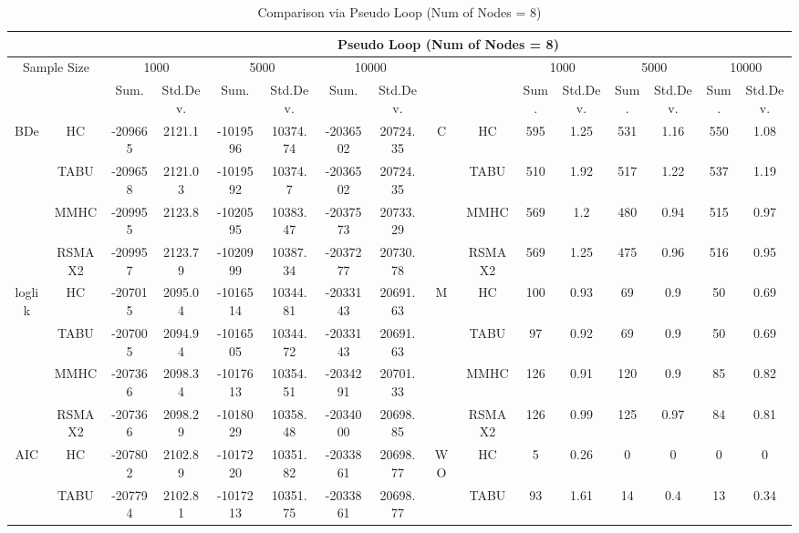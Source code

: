 \begin{table}[p]																										
\centering	\caption{Comparison via Pseudo Loop (Num of Nodes = 8)}	\tiny																						
{\tabcolsep=0.01in																										
\begin{tabular}{cc||cc|cc|cc||cc|cc|cc|cc}																										
\hline																										
&	&	\multicolumn{14}{c}{Pseudo Loop	(Num	of	Nodes	=	8)}\tabularnewline																			
\hline																										
\multicolumn{2}{c||}{Sample	Size}	&	\multicolumn{2}{c|}{1000}	&	\multicolumn{2}{c|}{5000}	&	\multicolumn{2}{c||}{10000}	&	&	&	\multicolumn{2}{c|}{1000}	&	\multicolumn{2}{c|}{5000}	&	\multicolumn{2}{c}{10000}\tabularnewline											
\hline																										
&	&	Sum.	&	Std.Dev.	&	Sum.	&	Std.Dev.	&	Sum.	&	Std.Dev.	&	&	&	Sum.	&	Std.Dev.	&	Sum.	&	Std.Dev.	&	Sum.	&	Std.Dev.\tabularnewline
\hline																										
\hline																										
\multirow{4}{*}{BDe} & HC &	-209665 & 	2121.1 & 	-1019596 & 	10374.74 & 	-2036502 & 	20724.35 & 	\multirow{4}{*}{C} & HC &	595 & 	1.25 & 	531 & 	1.16 & 	550 & 	1.08\tabularnewline													
& TABU &	-209658 & 	2121.03 & 	-1019592 & 	10374.7 & 	-2036502 & 	20724.35 & 	& TABU &	510 & 	1.92 & 	517 & 	1.22 & 	537 & 	1.19\tabularnewline													
& MMHC &	-209955 & 	2123.8 & 	-1020595 & 	10383.47 & 	-2037573 & 	20733.29 & 	& MMHC &	569 & 	1.2 & 	480 & 	0.94 & 	515 & 	0.97\tabularnewline													
& RSMAX2 &	-209957 & 	2123.79 & 	-1020999 & 	10387.34 & 	-2037277 & 	20730.78 & 	& RSMAX2 &	569 & 	1.25 & 	475 & 	0.96 & 	516 & 	0.95\tabularnewline													
\hline																										
\multirow{4}{*}{loglik} & HC &	-207015 & 	2095.04 & 	-1016514 & 	10344.81 & 	-2033143 & 	20691.63 & 	\multirow{4}{*}{M} & HC &	100 & 	0.93 & 	69 & 	0.9 & 	50 & 	0.69\tabularnewline													
& TABU &	-207005 & 	2094.94 & 	-1016505 & 	10344.72 & 	-2033143 & 	20691.63 & 	& TABU &	97 & 	0.92 & 	69 & 	0.9 & 	50 & 	0.69\tabularnewline													
& MMHC &	-207366 & 	2098.34 & 	-1017613 & 	10354.51 & 	-2034291 & 	20701.33 & 	& MMHC &	126 & 	0.91 & 	120 & 	0.9 & 	85 & 	0.82\tabularnewline													
& RSMAX2 &	-207366 & 	2098.29 & 	-1018029 & 	10358.48 & 	-2034000 & 	20698.85 & 	& RSMAX2 &	126 & 	0.99 & 	125 & 	0.97 & 	84 & 	0.81\tabularnewline													
\hline																										
\multirow{4}{*}{AIC} & HC &	-207802 & 	2102.89 & 	-1017220 & 	10351.82 & 	-2033861 & 	20698.77 & 	\multirow{4}{*}{WO} & HC &	5 & 	0.26 & 	0 & 	0 & 	0 & 	0\tabularnewline													
& TABU &	-207794 & 	2102.81 & 	-1017213 & 	10351.75 & 	-2033861 & 	20698.77 & 	& TABU &	93 & 	1.61 & 	14 & 	0.4 & 	13 & 	0.34\tabularnewline													

\end{tabular}}
\end{table}
